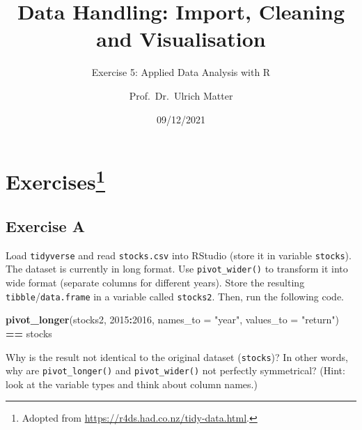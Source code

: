 \documentclass[
]{article}
\title{Data Handling: Import, Cleaning and Visualisation}
\subtitle{Exercise 5: Applied Data Analysis with R}
\author{Prof.~Dr.~Ulrich Matter}
\date{09/12/2021}
\newenvironment{Shaded}{\begin{snugshade}}{\end{snugshade}}
\newcommand{\DataTypeTok}[1]{\textcolor[rgb]{0.13,0.29,0.53}{#1}}
\newcommand{\KeywordTok}[1]{\textcolor[rgb]{0.13,0.29,0.53}{\textbf{#1}}}
\newcommand{\NormalTok}[1]{#1}
\newcommand{\OperatorTok}[1]{\textcolor[rgb]{0.81,0.36,0.00}{\textbf{#1}}}
\newcommand{\StringTok}[1]{\textcolor[rgb]{0.31,0.60,0.02}{#1}}
\begin{document}
\maketitle

\hypertarget{exercises}{%
\section[Exercises]{\texorpdfstring{Exercises\footnote{Adopted from
  \url{https://r4ds.had.co.nz/tidy-data.html}.}}{Exercises}}\label{exercises}}

\hypertarget{exercise-a}{%
\subsection{Exercise A}\label{exercise-a}}

Load \texttt{tidyverse} and read \texttt{stocks.csv} into RStudio (store
it in variable \texttt{stocks}). The dataset is currently in long
format. Use \texttt{pivot\_wider()} to transform it into wide format
(separate columns for different years). Store the resulting
\texttt{tibble}/\texttt{data.frame} in a variable called
\texttt{stocks2}. Then, run the following code.

\begin{Shaded}
\begin{Highlighting}[]
\KeywordTok{pivot\_longer}\NormalTok{(stocks2,  }\StringTok{\textasciigrave{}}\DataTypeTok{2015}\StringTok{\textasciigrave{}}\OperatorTok{:}\StringTok{\textasciigrave{}}\DataTypeTok{2016}\StringTok{\textasciigrave{}}\NormalTok{, }\DataTypeTok{names\_to =} \StringTok{"year"}\NormalTok{, }\DataTypeTok{values\_to =} \StringTok{"return"}\NormalTok{) }\OperatorTok{==}\StringTok{ }\NormalTok{stocks}
\end{Highlighting}
\end{Shaded}

Why is the result not identical to the original dataset
(\texttt{stocks})? In other words, why are \texttt{pivot\_longer()} and
\texttt{pivot\_wider()} not perfectly symmetrical? (Hint: look at the
variable types and think about column names.)
\end{document}
